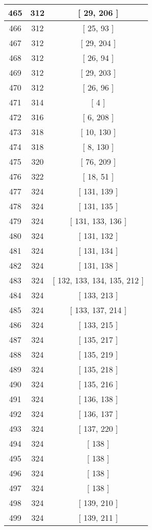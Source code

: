 \begin{center}
\begin{longtable}[H]{|| c c c ||}
\hline
465 & 312 & [ 29, 206 ] \\ 
\hline
466 & 312 & [ 25, 93 ] \\ 
\hline
467 & 312 & [ 29, 204 ] \\ 
\hline
468 & 312 & [ 26, 94 ] \\ 
\hline
469 & 312 & [ 29, 203 ] \\ 
\hline
470 & 312 & [ 26, 96 ] \\ 
\hline
471 & 314 & [ 4 ] \\ 
\hline
472 & 316 & [ 6, 208 ] \\ 
\hline
473 & 318 & [ 10, 130 ] \\ 
\hline
474 & 318 & [ 8, 130 ] \\ 
\hline
475 & 320 & [ 76, 209 ] \\ 
\hline
476 & 322 & [ 18, 51 ] \\ 
\hline
477 & 324 & [ 131, 139 ] \\ 
\hline
478 & 324 & [ 131, 135 ] \\ 
\hline
479 & 324 & [ 131, 133, 136 ] \\ 
\hline
480 & 324 & [ 131, 132 ] \\ 
\hline
481 & 324 & [ 131, 134 ] \\ 
\hline
482 & 324 & [ 131, 138 ] \\ 
\hline
483 & 324 & [ 132, 133, 134, 135, 212 ] \\ 
\hline
484 & 324 & [ 133, 213 ] \\ 
\hline
485 & 324 & [ 133, 137, 214 ] \\ 
\hline
486 & 324 & [ 133, 215 ] \\ 
\hline
487 & 324 & [ 135, 217 ] \\ 
\hline
488 & 324 & [ 135, 219 ] \\ 
\hline
489 & 324 & [ 135, 218 ] \\ 
\hline
490 & 324 & [ 135, 216 ] \\ 
\hline
491 & 324 & [ 136, 138 ] \\ 
\hline
492 & 324 & [ 136, 137 ] \\ 
\hline
493 & 324 & [ 137, 220 ] \\ 
\hline
494 & 324 & [ 138 ] \\ 
\hline
495 & 324 & [ 138 ] \\ 
\hline
496 & 324 & [ 138 ] \\ 
\hline
497 & 324 & [ 138 ] \\ 
\hline
498 & 324 & [ 139, 210 ] \\ 
\hline
499 & 324 & [ 139, 211 ] \\ 

\end{longtable}
\end{center}
